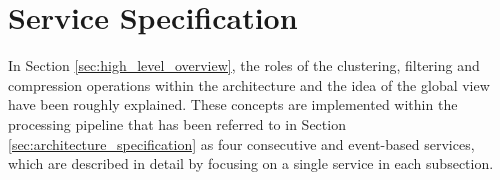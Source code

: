 \documentclass[../../main.tex]{subfiles}
\begin{document}
\section{Service Specification}\label{sec:service_specification}

In Section \ref{sec:high_level_overview}, the roles of the clustering, filtering and compression operations within the architecture and the idea of the global view have been roughly explained. These concepts are implemented within the processing pipeline that has been referred to in Section \ref{sec:architecture_specification} as four consecutive and event-based services, which are described in detail by focusing on a single service in each subsection.





\end{document}
